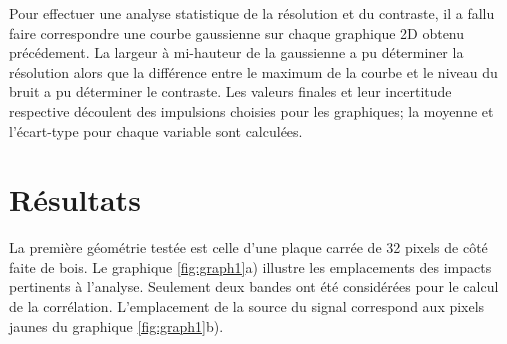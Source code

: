 \documentclass[conference]{IEEEtran}
\begin{document}
Pour effectuer une analyse statistique de la résolution et du contraste, il a fallu 
faire correspondre une courbe gaussienne sur chaque graphique 2D obtenu précédement. 
La largeur à mi-hauteur de la gaussienne a pu déterminer la résolution alors que la 
différence entre le maximum de la courbe et le niveau du bruit a pu déterminer le contraste.
Les valeurs finales et leur incertitude respective découlent des impulsions choisies pour 
les graphiques; la moyenne et l'écart-type pour chaque variable sont calculées.









\section{Résultats}

 
La première géométrie testée est celle d'une plaque carrée de 32 pixels de côté faite de bois. Le graphique \ref{fig:graph1}a)
illustre les emplacements des impacts pertinents à l'analyse. Seulement deux bandes ont été considérées
pour le calcul de la corrélation. L'emplacement de la source du signal correspond aux pixels jaunes du
graphique \ref{fig:graph1}b).
\end{document}
